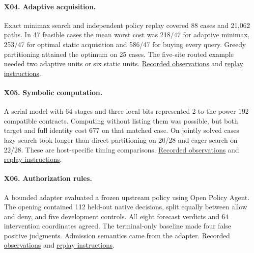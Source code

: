 \paragraph{X04. Adaptive acquisition.} Exact minimax search and independent policy replay covered 88 cases and 21,062 paths. In 47 feasible cases the mean worst cost was 218/47 for adaptive minimax, 253/47 for optimal static acquisition and 586/47 for buying every query. Greedy partitioning attained the optimum on 25 cases. The five-site routed example needed two adaptive units or six static units. \href{https://github.com/Perceptive-Closure/PC-X/blob/b6ce562aa91323f2913615b92e91ffb2b9cc4731/EXPERIMENTS/EXP-X04/results/summary.json}{Recorded observations} and \href{https://github.com/Perceptive-Closure/PC-X/blob/b6ce562aa91323f2913615b92e91ffb2b9cc4731/EXPERIMENTS/EXP-X04/README.md}{replay instructions}.

\paragraph{X05. Symbolic computation.} A serial model with 64 stages and three local bits represented 2 to the power 192 compatible contracts. Computing without listing them was possible, but both target and full identity cost 677 on that matched case. On jointly solved cases lazy search took longer than direct partitioning on 20/28 and eager search on 22/28. These are host-specific timing comparisons. \href{https://github.com/Perceptive-Closure/PC-X/blob/e288a6b5b8ddac24af349913bc68b640a691b2b2/EXPERIMENTS/EXP-X05/results/measurements.csv}{Recorded observations} and \href{https://github.com/Perceptive-Closure/PC-X/blob/e288a6b5b8ddac24af349913bc68b640a691b2b2/EXPERIMENTS/EXP-X05/README.md}{replay instructions}.

\paragraph{X06. Authorization rules.} A bounded adapter evaluated a frozen upstream policy using Open Policy Agent. The opening contained 112 held-out native decisions, split equally between allow and deny, and five development controls. All eight forecast verdicts and 64 intervention coordinates agreed. The terminal-only baseline made four false positive judgments. Admission semantics came from the adapter. \href{https://github.com/Perceptive-Closure/PC-X/blob/d3d8f0d6f14d548ce4b95dfa4341d8db54ad7876/EXPERIMENTS/EXP-X06/results/native.json}{Recorded observations} and \href{https://github.com/Perceptive-Closure/PC-X/blob/d3d8f0d6f14d548ce4b95dfa4341d8db54ad7876/EXPERIMENTS/EXP-X06/README.md}{replay instructions}.

